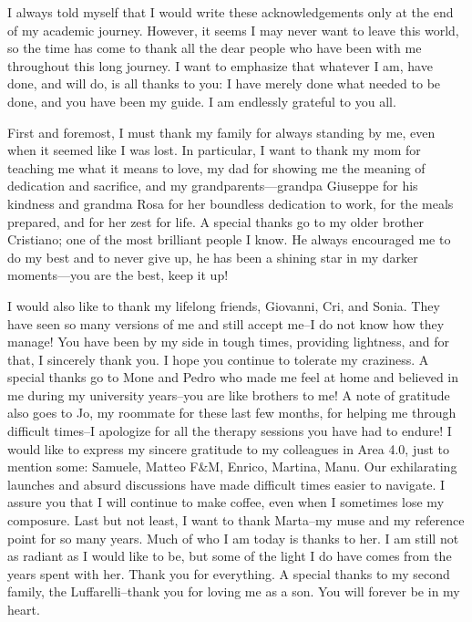 I always told myself that I would write these acknowledgements only at the end of my academic journey.
 However, it seems I may never want to leave this world, 
 so the time has come to thank all the dear people who have been with me throughout this long journey. 
 I want to emphasize that whatever I am, have done, and will do, is all thanks to you: 
 I have merely done what needed to be done, and you have been my guide. 
 I am endlessly grateful to you all.

First and foremost, 
 I must thank my family for always standing by me, 
 even when it seemed like I was lost. 
 In particular, I want to thank my mom for teaching me what it means to love, 
 my dad for showing me the meaning of dedication and sacrifice, 
 and my grandparents—grandpa Giuseppe for his kindness and grandma Rosa for her boundless dedication to work, for the meals prepared, and for her zest for life. 
 A special thanks go to my older brother Cristiano; 
 one of the most brilliant people I know.
 He always encouraged me to do my best and to never give up, 
 he has been a shining star in my darker moments—you are the best, keep it up!

I would also like to thank my lifelong friends, 
 Giovanni, Cri, and Sonia. 
 They have seen so many versions of me and still accept me--I do not know how they manage! 
 You have been by my side in tough times, providing lightness, and for that, I sincerely thank you. 
 I hope you continue to tolerate my craziness.
%
A special thanks go to Mone and Pedro who made me feel at home and believed in me during my university years--you are like brothers to me! 
%
A note of gratitude also goes to Jo, 
 my roommate for these last few months, 
 for helping me through difficult times--I apologize for all the therapy sessions you have had to endure!
%
I would like to express my sincere gratitude to my colleagues in Area 4.0, just to mention some: 
 Samuele, Matteo F\&M, Enrico, Martina, Manu. 
 Our exhilarating launches and absurd discussions have made difficult times easier to navigate. 
 I assure you that I will continue to make coffee, even when I sometimes lose my composure.
%
Last but not least, I want to thank Marta--my muse and my reference point for so many years. 
 Much of who I am today is thanks to her. 
 I am still not as radiant as I would like to be,
 but some of the light I do have comes from the years spent with her. 
 Thank you for everything.
%
A special thanks to my second family, the Luffarelli--thank you for loving me as a son. 
 You will forever be in my heart.
%

